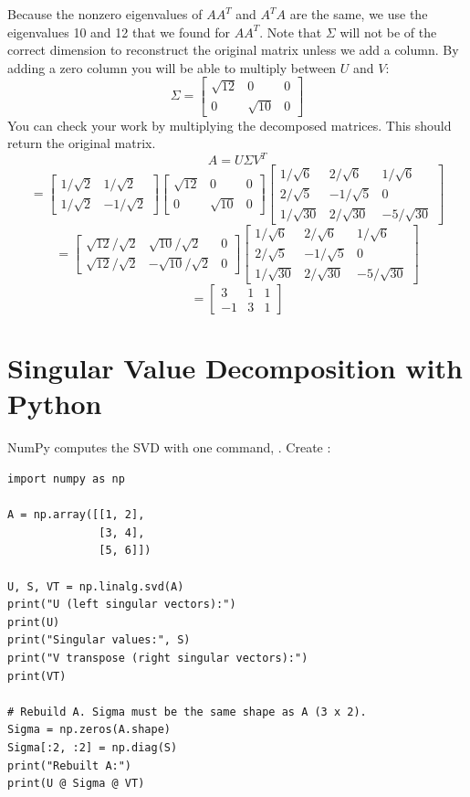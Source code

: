 Because the nonzero eigenvalues of $AA^T$ and $A^TA$ are the same, we use the eigenvalues 10 and 12 that we found for $AA^T$. Note that $\Sigma$ will not be of the correct dimension to reconstruct the original matrix unless we add a column. By adding a zero column you will be able to multiply between $U$ and $V$:
$$
\Sigma = 
\begin{bmatrix}
\sqrt{12} & 0 & 0\\
 0 & \sqrt{10} & 0 
\end{bmatrix}
$$
You can check your work by multiplying the decomposed matrices. This should return the original matrix.
$$A = U\Sigma V^T $$
$$ = 
\begin{bmatrix}
1/\sqrt{2} & 1/\sqrt{2} \\
1/\sqrt{2} & -1/\sqrt{2} 
\end{bmatrix}
\begin{bmatrix}
\sqrt{12} & 0 & 0\\
 0 & \sqrt{10} & 0 
\end{bmatrix}
\begin{bmatrix}
1/\sqrt{6} & 2/\sqrt{6} & 1/\sqrt{6} \\
2/\sqrt{5} & -1/\sqrt{5} & 0\\
1/\sqrt{30} & 2/\sqrt{30} & -5/\sqrt{30}
\end{bmatrix}
$$
$$=
\begin{bmatrix}
\sqrt{12}/\sqrt{2} & \sqrt{10}/\sqrt{2} & 0\\
\sqrt{12}/\sqrt{2} & -\sqrt{10}/\sqrt{2} & 0 
\end{bmatrix}
\begin{bmatrix}
1/\sqrt{6} & 2/\sqrt{6} & 1/\sqrt{6}\\
2/\sqrt{5} & -1/\sqrt{5} & 0 \\
1/\sqrt{30} & 2/\sqrt{30} & -5/\sqrt{30}
\end{bmatrix}
$$
$$
=
\begin{bmatrix}
3 & 1 & 1 \\
-1 & 3 & 1 
\end{bmatrix}
$$ 

\section{Singular Value Decomposition with Python}
NumPy computes the SVD with one command, . Create
:

\begin{verbatim}
import numpy as np

A = np.array([[1, 2],
              [3, 4],
              [5, 6]])

U, S, VT = np.linalg.svd(A)
print("U (left singular vectors):")
print(U)
print("Singular values:", S)
print("V transpose (right singular vectors):")
print(VT)

# Rebuild A. Sigma must be the same shape as A (3 x 2).
Sigma = np.zeros(A.shape)
Sigma[:2, :2] = np.diag(S)
print("Rebuilt A:")
print(U @ Sigma @ VT)
\end{verbatim}

